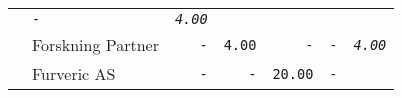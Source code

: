 \documentclass[11pt,A4paper,]{article}
\begin{document}
\begin{longtable}[]{@{}llrrrrr@{}}
\begin{minipage}[t]{0.14\columnwidth}
\end{minipage} & \begin{minipage}[t]{0.14\columnwidth}\raggedleft\strut
\texttt{-}\strut
\end{minipage} & \begin{minipage}[t]{0.14\columnwidth}\raggedleft\strut
\emph{\texttt{4.00}}\strut
\end{minipage}\tabularnewline
\begin{minipage}[t]{0.14\columnwidth}\raggedright\strut
\strut
\end{minipage} & \begin{minipage}[t]{0.14\columnwidth}\raggedright\strut
Forskning Partner\strut
\end{minipage} & \begin{minipage}[t]{0.14\columnwidth}\raggedleft\strut
\texttt{-}\strut
\end{minipage} & \begin{minipage}[t]{0.14\columnwidth}\raggedleft\strut
\texttt{4.00}\strut
\end{minipage} & \begin{minipage}[t]{0.14\columnwidth}\raggedleft\strut
\texttt{-}\strut
\end{minipage} & \begin{minipage}[t]{0.14\columnwidth}\raggedleft\strut
\texttt{-}\strut
\end{minipage} & \begin{minipage}[t]{0.14\columnwidth}\raggedleft\strut
\emph{\texttt{4.00}}\strut
\end{minipage}\tabularnewline
\begin{minipage}[t]{0.14\columnwidth}\raggedright\strut
\strut
\end{minipage} & \begin{minipage}[t]{0.14\columnwidth}\raggedright\strut
Furveric AS\strut
\end{minipage} & \begin{minipage}[t]{0.14\columnwidth}\raggedleft\strut
\texttt{-}\strut
\end{minipage} & \begin{minipage}[t]{0.14\columnwidth}\raggedleft\strut
\texttt{-}\strut
\end{minipage} & \begin{minipage}[t]{0.14\columnwidth}\raggedleft\strut
\texttt{20.00}\strut
\end{minipage} & \begin{minipage}[t]{0.14\columnwidth}\raggedleft\strut
\texttt{-}\strut
\end{minipage} & \begin{minipage}[t]{0.14\columnwidth}\raggedleft\strut

\end{minipage}
\end{longtable}
\end{document}
